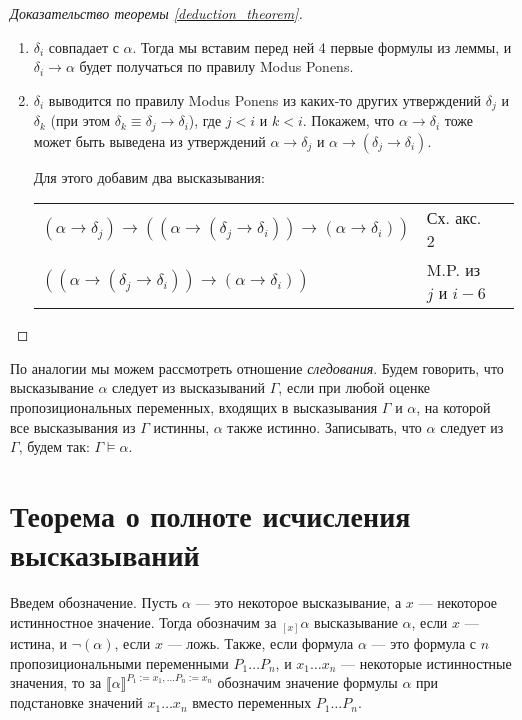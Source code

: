 \begin{proof}[Доказательство теоремы \ref{deduction_theorem}]
\begin{enumerate}
\item $\delta_i$ совпадает с $\alpha$. Тогда мы вставим перед 
ней 4 первые формулы из леммы, и $\delta_i \rightarrow \alpha$ будет получаться
по правилу Modus Ponens.

\item $\delta_i$ выводится по правилу Modus Ponens из каких-то других
утверждений $\delta_j$ и $\delta_k$ (при этом 
$\delta_k \equiv \delta_j \rightarrow \delta_i$), где $j < i$ и $k < i$.
Покажем, что $\alpha \rightarrow \delta_i$ тоже может быть выведена
из утверждений $\alpha \rightarrow \delta_j$ и 
$\alpha \rightarrow (\delta_j \rightarrow \delta_i)$.

Для этого добавим два высказывания:

\begin{tabular}{lll}
$(\alpha \rightarrow \delta_j) \rightarrow ((\alpha \rightarrow (\delta_j \rightarrow \delta_i)) \rightarrow (\alpha \rightarrow \delta_i))$ & Сх. акс. 2\\
$((\alpha \rightarrow (\delta_j \rightarrow \delta_i)) \rightarrow (\alpha \rightarrow \delta_i))$ & M.P. из $j$ и $i-6$\\
\end{tabular}

\end{enumerate}
\end{proof}

По аналогии мы можем рассмотреть отношение \emph{следования}.
Будем говорить, что высказывание $\alpha$ следует из высказываний $\Gamma$,
если при любой оценке пропозициональных переменных, входящих в высказывания 
$\Gamma$ и $\alpha$, на которой все высказывания из $\Gamma$ истинны,
$\alpha$ также истинно.
Записывать, что $\alpha$ следует из $\Gamma$, будем так: $\Gamma \models \alpha$.

\section{Теорема о полноте исчисления высказываний}

\begin{definition} 
Введем обозначение. Пусть $\alpha$ --- это некоторое высказывание, а $x$ --- некоторое
истинностное значение. Тогда обозначим за $_{[x]}\alpha$ высказывание
$\alpha$, если $x$ --- истина, и $\neg (\alpha)$, если $x$ --- ложь.
Также, если формула $\alpha$ --- это формула с $n$ пропозициональными переменными
$P_1 \dots P_n$, и $x_1 \dots x_n$ --- некоторые истинностные значения,
то за $\llbracket \alpha \rrbracket^{P_1 := x_1, \dots P_n := x_n}$ обозначим значение 
формулы $\alpha$ при подстановке значений $x_1 \dots x_n$ вместо переменных $P_1 \dots P_n$.
\end{definition}

